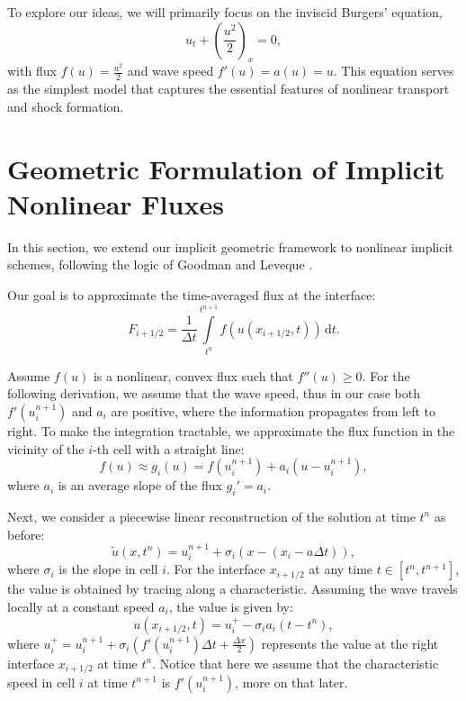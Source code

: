 To explore our ideas, we will primarily focus on the inviscid Burgers' equation,
\begin{equation}
    \label{eq:burgers}
    u_t + \left( \frac{u^2}{2} \right)_x = 0,
\end{equation}
with flux \( f(u) = \frac{u^2}{2} \) and wave speed \(f'(u) = a(u) = u\).
This equation serves as the simplest model that captures the essential features of nonlinear transport and shock formation.

\section{Geometric Formulation of Implicit Nonlinear Fluxes}%
\label{sec:geometric-implicit-nonlinear}

In this section, we extend our implicit geometric framework to nonlinear implicit schemes, following the logic of Goodman and Leveque \cite{goodman1988geometric}.


Our goal is to approximate the time-averaged flux at the interface: 
\begin{equation}
    F_{i+1/2} = \frac{1}{\Delta t} \int\limits_{t^{n}}^{t^{n+1}} f(u(x_{i+1/2},t)) \,\mathrm{d}t.
\end{equation}

Assume \(f(u)\) is a nonlinear, convex flux such that \(f''(u) \geq 0\).
For the following derivation, we assume that the wave speed, thus in our case both \(f'(u_{i}^{n+1})\) and \(a_i\) are positive, where the information propagates from left to right.
To make the integration tractable, we approximate the flux function in the vicinity of the \(i\)-th cell with a straight line:
\begin{equation}
    \label{eq:flux_approx}
    f(u) \approx g_i(u) = f(u_{i}^{n+1}) + a_i \left( u - u_{i}^{n+1} \right),
\end{equation}
where \(a_i\) is an average slope of the flux \(g_i' = a_i\).

Next, we consider a piecewise linear reconstruction of the solution at time \(t^n\) as before:
\begin{equation}
    \tilde{u}(x, t^n) = u_i^{n+1} + \sigma_i(x - (x_i - a\Delta t)),
\end{equation}
where \(\sigma_i\) is the slope in cell \(i\).
For the interface \(x_{i+1/2}\) at any time \(t \in [t^{n}, t^{n+1}]\), the value is obtained by tracing along a characteristic.
Assuming the wave travels locally at a constant speed \(a_i\), the value is given by:
\begin{equation}
    \label{eq:interface_val_approx}
    u(x_{i+1/2}, t) = u_i^+ - \sigma_i a_i \left( t - t^n \right),
\end{equation}
where \(u_i^+ = u_{i}^{n+1} + \sigma_i \left( f'(u_{i}^{n+1})\Delta t + \frac{\Delta x}{2} \right)\) represents the value at the right interface \(x_{i+1/2}\) at time \(t^n\).
Notice that here we assume that the characteristic speed in cell \(i\) at time \(t^{n+1}\) is \(f'(u_{i}^{n+1})\), more on that later.

